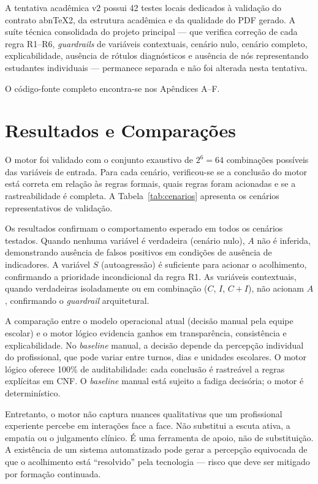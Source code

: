 \documentclass[
    12pt,
    openright,
    oneside,
    a4paper,
    english,
    brazil
]{abntex2}
\begin{document}
A tentativa acadêmica v2 possui 42 testes locais dedicados à validação do contrato abnTeX2, da estrutura acadêmica e da qualidade do PDF gerado. A suíte técnica consolidada do projeto principal --- que verifica correção de cada regra R1--R6, \textit{guardrails} de variáveis contextuais, cenário nulo, cenário completo, explicabilidade, ausência de rótulos diagnósticos e ausência de nós representando estudantes individuais --- permanece separada e não foi alterada nesta tentativa.

O código-fonte completo encontra-se nos Apêndices A--F.

\chapter{Resultados e Comparações}

O motor foi validado com o conjunto exaustivo de $2^6 = 64$ combinações possíveis das variáveis de entrada. Para cada cenário, verificou-se se a conclusão do motor está correta em relação às regras formais, quais regras foram acionadas e se a rastreabilidade é completa. A Tabela~\ref{tab:cenarios} apresenta os cenários representativos de validação.

Os resultados confirmam o comportamento esperado em todos os cenários testados. Quando nenhuma variável é verdadeira (cenário nulo), $A$ não é inferida, demonstrando ausência de falsos positivos em condições de ausência de indicadores. A variável $S$ (autoagressão) é suficiente para acionar o acolhimento, confirmando a prioridade incondicional da regra R1. As variáveis contextuais, quando verdadeiras isoladamente ou em combinação ($C$, $I$, $C+I$), não acionam $A$, confirmando o \textit{guardrail} arquitetural.

A comparação entre o modelo operacional atual (decisão manual pela equipe escolar) e o motor lógico evidencia ganhos em transparência, consistência e explicabilidade. No \textit{baseline} manual, a decisão depende da percepção individual do profissional, que pode variar entre turnos, dias e unidades escolares. O motor lógico oferece 100\% de auditabilidade: cada conclusão é rastreável a regras explícitas em CNF. O \textit{baseline} manual está sujeito a fadiga decisória; o motor é determinístico.

Entretanto, o motor não captura nuances qualitativas que um profissional experiente percebe em interações face a face. Não substitui a escuta ativa, a empatia ou o julgamento clínico. É uma ferramenta de apoio, não de substituição. A existência de um sistema automatizado pode gerar a percepção equivocada de que o acolhimento está ``resolvido'' pela tecnologia --- risco que deve ser mitigado por formação continuada.
\end{document}
